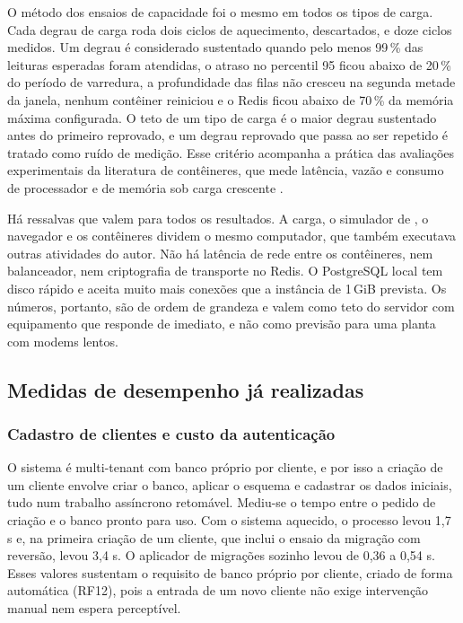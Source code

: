 \par O método dos ensaios de capacidade foi o mesmo em todos os tipos de carga. Cada degrau de carga roda dois ciclos de aquecimento, descartados, e doze ciclos medidos. Um degrau é considerado sustentado quando pelo menos 99\,\% das leituras esperadas foram atendidas, o atraso no percentil 95 ficou abaixo de 20\,\% do período de varredura, a profundidade das filas não cresceu na segunda metade da janela, nenhum contêiner reiniciou e o Redis ficou abaixo de 70\,\% da memória máxima configurada. O teto de um tipo de carga é o maior degrau sustentado antes do primeiro reprovado, e um degrau reprovado que passa ao ser repetido é tratado como ruído de medição. Esse critério acompanha a prática das avaliações experimentais da literatura de contêineres, que mede latência, vazão e consumo de processador e de memória sob carga crescente \cite{NETTO2019_RAFT_KUBERNETES,NETTO2016_STATE_MACHINE_REPLICATION_KUBERNETES}.

\par Há ressalvas que valem para todos os resultados. A carga, o simulador de , o navegador e os contêineres dividem o mesmo computador, que também executava outras atividades do autor. Não há latência de rede entre os contêineres, nem balanceador, nem criptografia de transporte no Redis. O PostgreSQL local tem disco rápido e aceita muito mais conexões que a instância de 1\,GiB prevista. Os números, portanto, são de ordem de grandeza e valem como teto do servidor com equipamento que responde de imediato, e não como previsão para uma planta com modems lentos.

\subsection{Medidas de desempenho já realizadas}

\subsubsection{Cadastro de clientes e custo da autenticação}

\par O sistema é multi-tenant com banco próprio por cliente, e por isso a criação de um cliente envolve criar o banco, aplicar o esquema e cadastrar os dados iniciais, tudo num trabalho assíncrono retomável. Mediu-se o tempo entre o pedido de criação e o banco pronto para uso. Com o sistema aquecido, o processo levou 1,7 s e, na primeira criação de um cliente, que inclui o ensaio da migração com reversão, levou 3,4 s. O aplicador de migrações sozinho levou de 0,36 a 0,54 s. Esses valores sustentam o requisito de banco próprio por cliente, criado de forma automática (RF12), pois a entrada de um novo cliente não exige intervenção manual nem espera perceptível.

